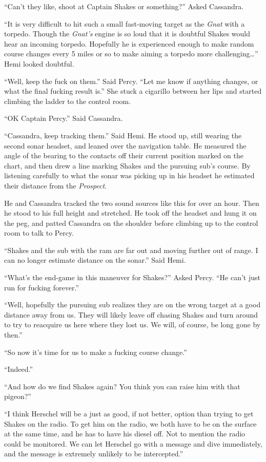 \documentclass[]{scrbook}
\begin{document}
``Can't they like, shoot at Captain Shakes or something?'' Asked
Cassandra.

``It is very difficult to hit such a small fast-moving target as the
\emph{Gnat} with a torpedo. Though the \emph{Gnat's} engine is so loud
that it is doubtful Shakes would hear an incoming torpedo. Hopefully he
is experienced enough to make random course changes every 5 miles or so
to make aiming a torpedo more challenging\ldots{}'' Hemi looked
doubtful.

``Well, keep the fuck on them.'' Said Percy. ``Let me know if anything
changes, or what the final fucking result is.'' She stuck a cigarillo
between her lips and started climbing the ladder to the control room.

``OK Captain Percy.'' Said Cassandra.

``Cassandra, keep tracking them.'' Said Hemi. He stood up, still wearing
the second sonar headset, and leaned over the navigation table. He
measured the angle of the bearing to the contacts off their current
position marked on the chart, and then drew a line marking Shakes and
the pursuing sub's course. By listening carefully to what the sonar was
picking up in his headset he estimated their distance from the
\emph{Prospect}.

He and Cassandra tracked the two sound sources like this for over an
hour. Then he stood to his full height and stretched. He took off the
headset and hung it on the peg, and patted Cassandra on the shoulder
before climbing up to the control room to talk to Percy.

``Shakes and the sub with the ram are far out and moving further out of
range. I can no longer estimate distance on the sonar.'' Said Hemi.

``What's the end-game in this maneuver for Shakes?'' Asked Percy. ``He
can't just run for fucking forever.''

``Well, hopefully the pursuing sub realizes they are on the wrong target
at a good distance away from us. They will likely leave off chasing
Shakes and turn around to try to reacquire us here where they lost us.
We will, of course, be long gone by then.''

``So now it's time for us to make a fucking course change.''

``Indeed.''

``And how do we find Shakes again? You think you can raise him with that
pigeon?''

``I think Herschel will be a just as good, if not better, option than
trying to get Shakes on the radio. To get him on the radio, we both have
to be on the surface at the same time, and he has to have his diesel
off. Not to mention the radio could be monitored. We can let Herschel go
with a message and dive immediately, and the message is extremely
unlikely to be intercepted.''
\end{document}
